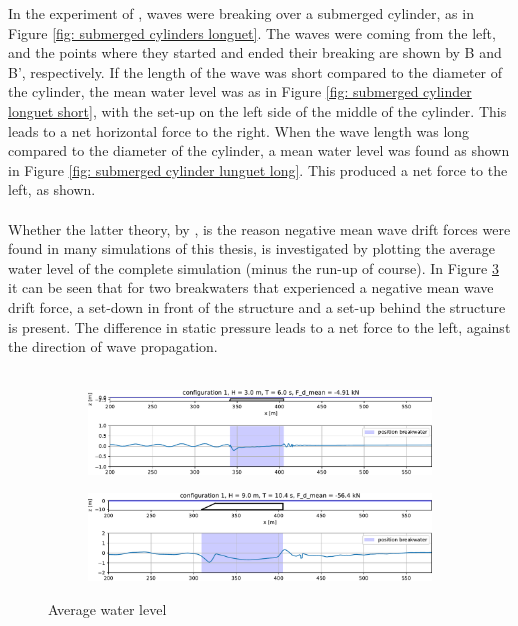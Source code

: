 In the experiment of \citet{longuethiggins1977}, waves were breaking over a submerged cylinder, as in Figure \ref{fig: submerged cylinders longuet}. The waves were coming from the left, and the points where they started and ended their breaking are shown by B and B', respectively. If the length of the wave was short compared to the diameter of the cylinder, the mean water level was as in Figure \ref{fig: submerged cylinder longuet short}, with the set-up on the left side of the middle of the cylinder. This leads to a net horizontal force to the right. When the wave length was long compared to the diameter of the cylinder, a mean water level was found as shown in Figure \ref{fig: submerged cylinder lunguet long}. This produced a net force to the left, as shown. \\
\\
Whether the latter theory, by \citet{longuethiggins1977}, is the reason negative mean wave drift forces were found in many simulations of this thesis, is investigated by plotting the average water level of the complete simulation (minus the run-up of course). In Figure \ref{fig: average wl two configs} it can be seen that for two breakwaters that experienced a negative mean wave drift force, a set-down in front of the structure and a set-up behind the structure is present. The difference in static pressure leads to a net force to the left, against the direction of wave propagation.\\
\\




\begin{figure}[h]
    \centering
    \begin{subfigure}[b]{0.49\textwidth}
        \centering
        \includegraphics[width=\textwidth]{figures/ComFLOW/Results average wl/configuration1_DI1_WC1_Fd.pdf}
        \caption[]%
        {{\small }}    
        \label{}
    \end{subfigure}
    \hfill
    \begin{subfigure}[b]{0.49\textwidth}   
        \centering 
        \includegraphics[width=\textwidth]{figures/ComFLOW/Results average wl/configuration1_DI1_WC2_Fd.pdf}
        \caption[]%
        {{\small }}    
        \label{}
    \end{subfigure}


    \caption{Average water level}
    \label{fig: average wl two configs}
\end{figure}


